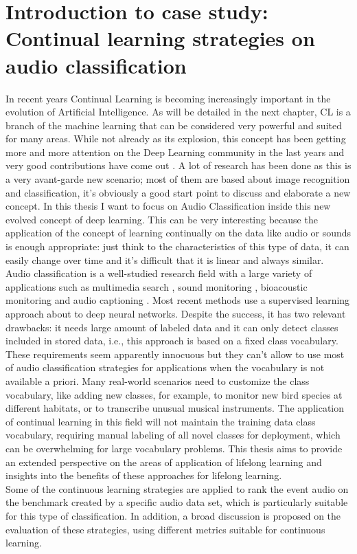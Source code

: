 \documentclass[english, LaM, oneside]{sapthesis}%
\begin{document}
\section{Introduction to case study: Continual learning strategies on audio classification}
In recent years Continual Learning is becoming increasingly important in the evolution of Artificial Intelligence. As will be detailed in the next chapter, CL is a branch of the machine learning that can be considered very powerful and suited for many areas. While not already as its explosion, this concept has been getting more and more attention on the Deep Learning community in the last years and very good contributions have come out \cite{hoiem, Kirkpatrick}.
A lot of research has been done as this is a very avant-garde new scenario; most of them are based about image recognition and classification, it’s obviously a good start point to discuss and elaborate a new concept.
\newline \newline
In this thesis I want to focus on Audio Classification inside this new evolved concept of deep learning. This can be very interesting because the application of the concept of learning continually on the data like audio or sounds is enough appropriate: just think to the characteristics of this type of data, it can easily change over time and it’s difficult that it is linear and always similar.
Audio classification is a well-studied research field \cite{zhang} with a large variety of applications such as multimedia search  \cite {gemmeke}, sound monitoring \cite{bello}, bioacoustic monitoring \cite{salamon} and audio captioning \cite{drossos}. Most recent methods use a supervised learning approach about to deep neural networks. Despite the success, it has two relevant drawbacks: it needs large amount of labeled data and it can only detect classes included in stored data, i.e., this approach is based on a fixed class vocabulary. These requirements seem apparently innocuous but they can't allow to use most of audio classification strategies for applications when the vocabulary is not available a priori. Many real-world scenarios need to customize the class vocabulary, like adding new classes, for example, to monitor new bird species at different habitats, or to transcribe unusual musical instruments.
\newline \newline
The application of continual learning in this field will not maintain the training data class vocabulary, requiring manual labeling of all novel classes for deployment, which can be overwhelming for large vocabulary problems.
This thesis aims to provide an extended perspective on the areas of application of lifelong learning and insights into the benefits of these approaches for lifelong learning.
\\
Some of the continuous learning strategies are applied to rank the event audio on the benchmark created by a specific audio data set, which is particularly suitable for this type of classification. In addition, a broad discussion is proposed on the evaluation of these strategies, using different metrics suitable for continuous learning. 
\end{document}
